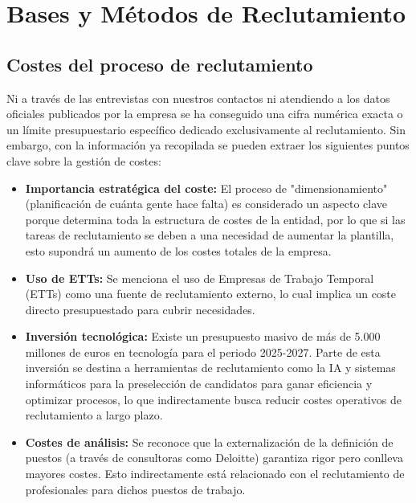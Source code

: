 
\section{Bases y Métodos de Reclutamiento}

\subsection{Costes del proceso de reclutamiento}

Ni a través de las entrevistas con nuestros contactos ni atendiendo a los datos oficiales publicados por la empresa se ha conseguido una cifra numérica exacta o un límite presupuestario específico dedicado exclusivamente al reclutamiento. Sin embargo, con la información ya recopilada se pueden extraer los siguientes puntos clave sobre la gestión de costes:

\begin{itemize}
    \item \textbf{Importancia estratégica del coste:} El proceso de "dimensionamiento" (planificación de cuánta gente hace falta) es considerado un aspecto clave porque determina toda la estructura de costes de la entidad, por lo que si las tareas de reclutamiento se deben a una necesidad de aumentar la plantilla, esto supondrá un aumento de los costes totales de la empresa.
    \item \textbf{Uso de ETTs:} Se menciona el uso de Empresas de Trabajo Temporal (ETTs) como una fuente de reclutamiento externo, lo cual implica un coste directo presupuestado para cubrir necesidades.
    \item \textbf{Inversión tecnológica:} Existe un presupuesto masivo de más de 5.000 millones de euros en tecnología para el periodo 2025-2027. Parte de esta inversión se destina a herramientas de reclutamiento como la IA y sistemas informáticos para la preselección de candidatos para ganar eficiencia y optimizar procesos, lo que indirectamente busca reducir costes operativos de reclutamiento a largo plazo.
    \item \textbf{Costes de análisis:} Se reconoce que la externalización de la definición de puestos (a través de consultoras como Deloitte) garantiza rigor pero conlleva mayores costes. Esto indirectamente está relacionado con el reclutamiento de profesionales para dichos puestos de trabajo.
\end{itemize}

